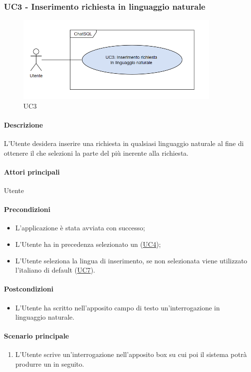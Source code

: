 \subsubsection{UC3 - Inserimento richiesta in linguaggio naturale}\label{UC3}

\begin{figure}[H]
  \centering
  \includegraphics[width=0.90\textwidth]{assets/uc3.png}
  \caption{UC3}
\end{figure}

\paragraph*{Descrizione}
L’Utente desidera inserire una richiesta in qualsiasi linguaggio naturale al fine di ottenere il  che selezioni la parte del  più inerente alla richiesta. 

\paragraph*{Attori principali}
Utente

\paragraph*{Precondizioni}
\begin{itemize}
  \item L'applicazione è stata avviata con successo;
  \item L’Utente ha in precedenza selezionato un  (\hyperref[UC4]{UC4}); 
  \item L'Utente seleziona la lingua di inserimento, se non selezionata viene utilizzato l'italiano di default (\hyperref[UC7]{UC7}).
\end{itemize}

\paragraph*{Postcondizioni}
\begin{itemize}
  \item L’Utente ha scritto nell’apposito campo di testo un'interrogazione in linguaggio naturale.
\end{itemize}

\paragraph*{Scenario principale}
\begin{enumerate}
  \item L’Utente scrive un'interrogazione nell’apposito box su cui poi il sistema potrà produrre un  in seguito.
\end{enumerate}
